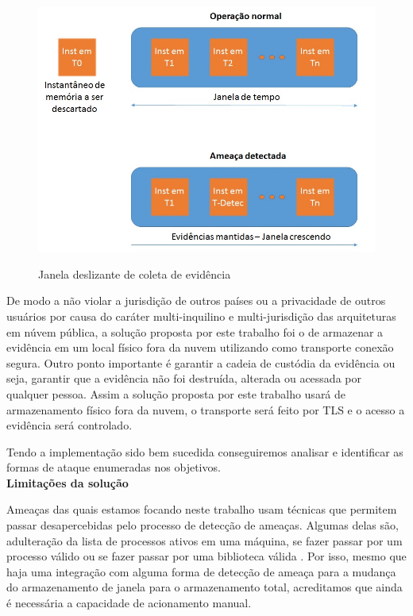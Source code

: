 \documentclass[
	12pt,				%
	openright,			%
	oneside,			%
	a4paper,			%
	english,			%
	brazil,				%
	]{abntex2}
\begin{document}
\begin{figure}[h!]
\caption{Janela deslizante de coleta de evidência}
\includegraphics[scale=0.5]{janela.jpg}
\centering
\label{fig:janela}
\end{figure}

De modo a não violar a jurisdição de outros países ou a privacidade de outros usuários por causa do caráter multi-inquilino e multi-jurisdição das arquiteturas em núvem pública,
a solução proposta por este trabalho foi o de armazenar a evidência em um local físico fora da nuvem utilizando como transporte conexão segura. Outro ponto importante é 
garantir a cadeia de custódia da evidência ou seja, garantir que a evidência não foi destruída, alterada ou acessada por qualquer pessoa. Assim a solução proposta por este 
trabalho usará de armazenamento físico fora da nuvem, o transporte será feito por TLS e o acesso a evidência será controlado.

Tendo a implementação sido bem sucedida conseguiremos analisar e identificar as formas de ataque enumeradas nos objetivos.\\

\textbf{Limitações da solução}

Ameaças das quais estamos focando neste trabalho usam técnicas que permitem passar desapercebidas pelo processo de detecção de ameaças. Algumas delas são, 
adulteração da lista de processos ativos em uma máquina, se fazer passar por um processo válido ou se fazer passar por uma biblioteca válida \cite{Case2014}. Por isso, 
mesmo que haja uma integração com alguma forma de detecção de ameaça para a mudança do armazenamento de janela para o armazenamento total, acreditamos que ainda é 
necessária a capacidade de acionamento manual.
\end{document}
